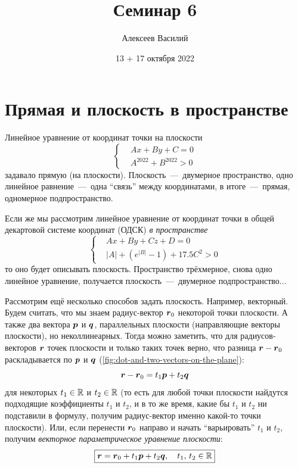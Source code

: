 \documentclass[a4paper,12pt]{article}
\author{Алексеев Василий}
\title{Семинар 6}
\date{13 + 17 октября 2022}
\begin{document}
  \maketitle
  
  \tableofcontents

  \thispagestyle{empty}
  
  \newpage
  


  \section{Прямая и плоскость в пространстве}
  
  Линейное уравнение от координат точки на плоскости
  \[
    \left\{
      \begin{aligned}
        &Ax + By + C = 0\\
        &A^{2022} + B^{2022} > 0
      \end{aligned}
    \right.
  \]
  задавало прямую (на плоскости).
  Плоскость~---~двумерное пространство, одно линейное равнение~---~одна ``связь'' между координатами, в итоге~---~прямая, одномерное подпространство.
  
  Если же мы рассмотрим линейное уравнение от координат точки в общей декартовой системе координат (ОДСК) \emph{в пространстве}
  \begin{equation}\label{eq:plane-by-coords}
    \boxed{
      \left\{
        \begin{aligned}
          &Ax + By + Cz + D = 0\\
          &|A| + \left(e^{|B|} - 1\right) + 17.5 C^2 > 0
        \end{aligned}
      \right.
    }
  \end{equation}
  то оно будет описывать плоскость.
  Пространство трёхмерное, снова одно линейное уравнение, получается плоскость~---~двумерное подпространство...
  
  Рассмотрим ещё несколько способов задать плоскость.
  Например, векторный.
  Будем считать, что мы знаем радиус-вектор $\boldsymbol r_0$ некоторой точки плоскости.
  А также два вектора $\boldsymbol p$ и $\boldsymbol q$, параллельных плоскости (направляющие векторы плоскости), но неколлинеарных.
  Тогда можно заметить, что для радиусов-векторов $\boldsymbol r$ точек плоскости и только таких точек верно, что разница $\bds r \hm- \bds r_0$ раскладывается по $\boldsymbol p$ и $\boldsymbol q$ (\ref{fig:dot-and-two-vectors-on-the-plane}):
  \[
    \boldsymbol r - \boldsymbol r_0 = t_1 \boldsymbol p + t_2 \boldsymbol q
  \]
  для некоторых $t_1 \hm\in \RR$ и $t_2 \hm\in \RR$ (то есть для любой точки плоскости найдутся подходящие коэффициенты $t_1$ и $t_2$, и в то же время, какие бы $t_1$ и $t_2$ ни подставили в формулу, получим радиус-вектор именно какой-то точки плоскости).
  Или, если перенести $\boldsymbol r_0$ направо и начать ``варьировать'' $t_1$ и $t_2$, получим \emph{векторное параметрическое уравнение плоскости}:
  \begin{equation}\label{eq:plane-vector-parametric}
    \boxed{
      \boldsymbol r = \boldsymbol r_0 + t_1 \boldsymbol p + t_2 \boldsymbol q,\quad t_1,\, t_2 \in \operatorname{\mathbb R}
    }
  \end{equation}
  
\end{document}
